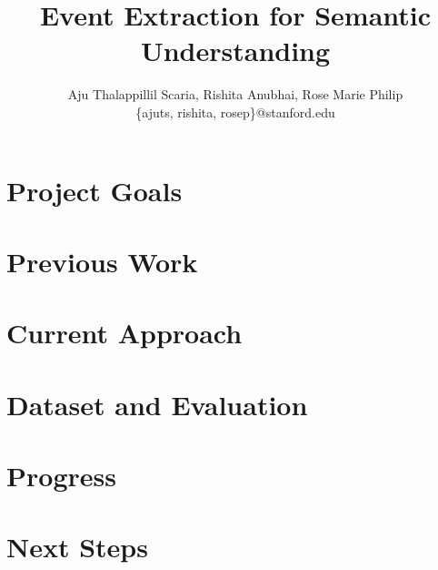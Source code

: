 \documentclass[letterpaper]{article}
\begin{document}
\title{
 Event Extraction for Semantic Understanding
}

\author{
Aju Thalappillil Scaria, Rishita Anubhai, Rose Marie Philip \\
\{ajuts, rishita, rosep\}@stanford.edu\\
}

\maketitle


%

\section{Project Goals}
\label{sec:projectgoals}


\section{Previous Work}
\label{sec:previousapproaches}


\section{Current Approach}
\label{sec:currentapproach}


\section{Dataset and Evaluation}
\label{sec:dataset}


\section{Progress}
\label{sec:progress}


\section{Next Steps}
\label{sec:nextsteps}


%
%

%
\end{document}
